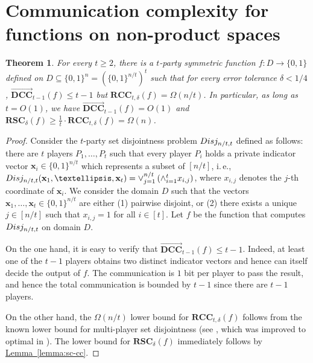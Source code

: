 \documentclass[11pt]{article}
\numberwithin{equation}{section}
\newtheorem{theorem}{Theorem}[section]
\theoremstyle{definition}
\theoremstyle{plain}
\newcommand{\ie}{i.\,e.}
\newcommand{\expref}[2]{\hyperref[#2]{#1~\ref{#2}}}
\newcommand{\zo}{\ensuremath{ \{ 0, 1 \} }}
\newcommand{\zon}{\ensuremath{ \{ 0, 1 \}^n }}
\newcommand{\error}{\ensuremath{\delta}}
\newcommand{\bigo}[1]{\ensuremath{{{O} \left( {#1} \right)}}}
\newcommand{\bigomega}[1]{\ensuremath{{\Omega \left( {#1} \right)}}}
\newcommand{\rcc}{\ensuremath{\mathbf{RCC}}}
\newcommand{\rsc}{\ensuremath{\mathbf{RSC}}}
\newcommand{\dccone}{\ensuremath{\overrightarrow{\mathbf{DCC}}}}
\begin{document}
\section{Communication complexity for functions on non-product spaces}

\begin{theorem}\label{theorem:1-n-separation}
For every $t\ge 2$, there is a $t$-party symmetric function 
$f: D  \to \zo$ 
defined on $D\subseteq \zon= \left(\zo^{n/t} \right)^t$ 
such that for every error tolerance $\error<1/4$, 
$\dccone_{t-1}(f)\le t-1$ but $\rcc_{t,\error}(f)=  \bigomega{ n/t }$. 
In particular, 
as long as $t=\bigo{1}$, we have $\dccone_{t-1}(f) =\bigo{1}$ and $\rsc_\error(f) \ge {\frac{1}{t}\cdot\rcc_{t,\error}(f)} = \bigomega{n}$.
\end{theorem}


\begin{proof}
Consider the $t$-party set disjointness problem $\textsc{Disj}_{n/t,t}$ defined as follows:
there are $t$ players $P_1,\dots, P_t$ such that every player $P_i$ holds a private indicator vector $\mathbf{x}_i\in \zo^{n/t}$ which represents a subset of $[n/t]$, 
\ie,~$\textsc{Disj}_{n/t,t}(\mathbf{x}_1,\dots, \mathbf{x}_t)=\vee_{j=1}^{n/t} \left(\wedge_{i=1}^t x_{i,j}\right)$, where $x_{i,j}$ denotes the $j$-th coordinate of $\mathbf{x}_i$.
We consider the domain $D$ such that the vectors $\mathbf{x}_1,\dots, \mathbf{x}_t\in\zo^{n/t}$ are either
(1) pairwise disjoint, or (2) {\color{black} there exists a unique $j \in [n/t]$ such that $x_{i,j} = 1$ for all $i \in [t]$.}
%
Let $f$ be the function that computes $\textsc{Disj}_{n/t,t}$ on domain $D$.

On the one hand, it is easy to verify that $\dccone_{t-1}(f)\le t-1$. 
Indeed, at least one of the $t-1$ players obtains two distinct indicator vectors and hence can itself decide the output of $f$. 
The communication is $1$ bit per player to pass the result, and hence the total communication is bounded by $t-1$ since there are $t-1$ players.


On the other hand, the $\Omega(n/t)$ lower bound for $\rcc_{t,\error}(f)$ follows from the known lower bound for multi-player set disjointness 
(see \cite{BarYossef:2004eya}, which was improved to optimal in \cite{g09,jayram2009hellinger}). 
The lower bound for $\rsc_\error(f)$ immediately follows by \expref{Lemma}{lemma:sc-cc}.
\end{proof}
\end{document}
